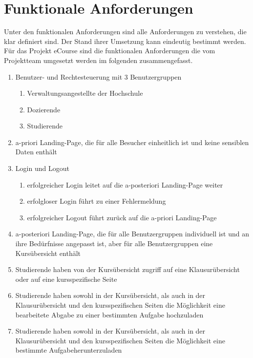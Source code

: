 
\chapter{Funktionale Anforderungen}
\label{sec:funktionale_Anforderungen}
Unter den funktionalen Anforderungen sind alle Anforderungen zu verstehen, die klar definiert sind. Der Stand ihrer Umsetzung kann eindeutig bestimmt werden. \\
Für das Projekt eCourse sind die funktionalen Anforderungen die vom Projektteam umgesetzt werden im folgenden zusammengefasst.\\
\begin{enumerate}
	\item Benutzer- und Rechtesteuerung mit 3 Benutzergruppen
	\begin{enumerate}
		\item \gls{Verwaltungsangestellte} der Hochschule
		\item \gls{Dozierende}
		\item \gls{Studierende}
	\end{enumerate}
	\item a-priori \gls{Landing-Page}, die für alle Besucher einheitlich ist und keine sensiblen Daten enthält
	\item Login und Logout
	\begin{enumerate}
		\item erfolgreicher Login leitet auf die a-posteriori \gls{Landing-Page} weiter
		\item erfolgloser Login führt zu einer Fehlermeldung
		\item erfolgreicher Logout führt zurück auf die a-priori \gls{Landing-Page}
	\end{enumerate}
	\item a-posteriori \gls{Landing-Page}, die für alle Benutzergruppen individuell ist und an ihre Bedürfnisse angepasst ist, aber für alle Benutzergruppen eine Kursübersicht enthält
	\item \gls{Studierende} haben von der Kursübersicht zugriff auf eine Klausurübersicht oder auf eine \gls{kursspezifische} Seite
	\item \gls{Studierende} haben sowohl in der Kursübersicht, als auch in der Klausurübersicht und den \gls{kursspezifische}n Seiten die Möglichkeit eine \gls{bearbeitete} Abgabe zu einer bestimmten \gls{Aufgabe} hochzuladen
	\item \gls{Studierende} haben sowohl in der Kursübersicht, als auch in der Klausurübersicht und den \gls{kursspezifische}n Seiten die Möglichkeit eine bestimmte \gls{Aufgabe}herunterzuladen

\end{enumerate}
